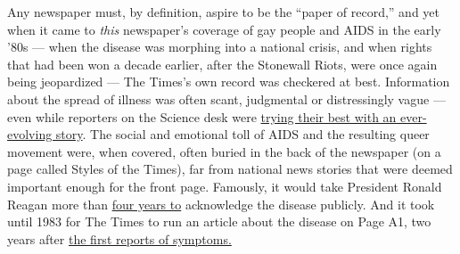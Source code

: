 Any newspaper must, by definition, aspire to be the ``paper of record,''
and yet when it came to \emph{this} newspaper's coverage of gay people
and AIDS in the early '80s --- when the disease was morphing into a
national crisis, and when rights that had been won a decade earlier,
after the Stonewall Riots, were once again being jeopardized --- The
Times's own record was checkered at best. Information about the spread
of illness was often scant, judgmental or distressingly vague --- even
while reporters on the Science desk were
\href{https://www.nytimes.com/2018/04/13/t-magazine/nyt-writers-80s-coverage.html?rref=collection\%2Fsectioncollection\%2Ft-magazine\&action=click\&contentCollection=t-magazine\&region=stream\&module=stream_unit\&version=latest\&contentPlacement=18\&pgtype=sectionfront}{trying
their best with an ever-evolving story}. The social and emotional toll
of AIDS and the resulting queer movement were, when covered, often
buried in the back of the newspaper (on a page called Styles of the
Times), far from national news stories that were deemed important enough
for the front page. Famously, it would take President Ronald Reagan more
than
\href{https://www.nytimes.com/1987/10/11/opinion/the-reagan-aids-strategy-in-ruins.html}{four
years to} acknowledge the disease publicly. And it took until 1983 for
The Times to run an article about the disease on Page A1, two years
after
\href{https://www.nytimes.com/1981/07/03/us/rare-cancer-seen-in-41-homosexuals.html}{the
first reports of symptoms.}

